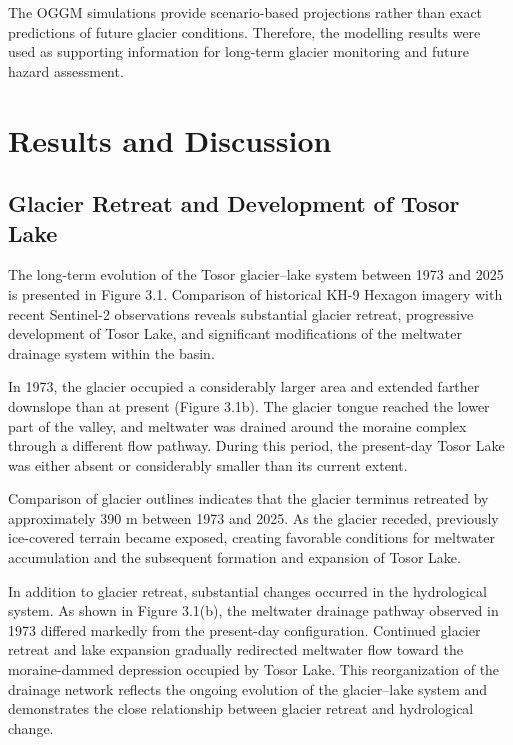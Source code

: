 \documentclass[12pt,a4paper]{report}
\begin{document}
The OGGM simulations provide scenario-based projections rather than exact predictions of future glacier conditions. Therefore, the modelling results were used as supporting information for long-term glacier monitoring and future hazard assessment.

\chapter{Results and Discussion}

\section{Glacier Retreat and Development of Tosor Lake}

The long-term evolution of the Tosor glacier–lake system between 1973 and 2025 is presented in Figure 3.1. Comparison of historical KH-9 Hexagon imagery with recent Sentinel-2 observations reveals substantial glacier retreat, progressive development of Tosor Lake, and significant modifications of the meltwater drainage system within the basin.

In 1973, the glacier occupied a considerably larger area and extended farther downslope than at present (Figure 3.1b). The glacier tongue reached the lower part of the valley, and meltwater was drained around the moraine complex through a different flow pathway. During this period, the present-day Tosor Lake was either absent or considerably smaller than its current extent.

Comparison of glacier outlines indicates that the glacier terminus retreated by approximately 390 m between 1973 and 2025. As the glacier receded, previously ice-covered terrain became exposed, creating favorable conditions for meltwater accumulation and the subsequent formation and expansion of Tosor Lake.

In addition to glacier retreat, substantial changes occurred in the hydrological system. As shown in Figure 3.1(b), the meltwater drainage pathway observed in 1973 differed markedly from the present-day configuration. Continued glacier retreat and lake expansion gradually redirected meltwater flow toward the moraine-dammed depression occupied by Tosor Lake. This reorganization of the drainage network reflects the ongoing evolution of the glacier–lake system and demonstrates the close relationship between glacier retreat and hydrological change.
\end{document}
